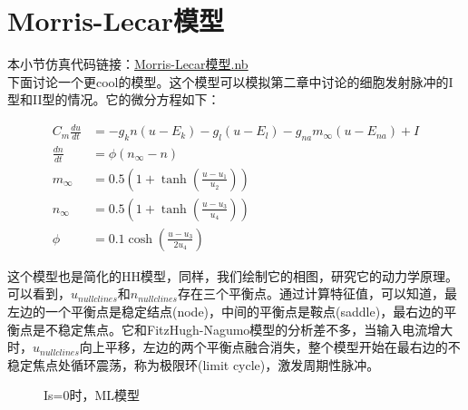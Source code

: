 \documentclass[12pt, a4paper, oneside]{ctexbook}
\begin{document}

\section{Morris-Lecar模型}
\textcolor[rgb]{1,0,0}{本小节仿真代码链接：\href{./降维到二维/Morris-Lecar模型.nb}{Morris-Lecar模型.nb}}\\
下面讨论一个更cool的模型。这个模型可以模拟第二章中讨论的细胞发射脉冲的I型和II型的情况。它的微分方程如下：

\begin{equation}
    \begin{aligned}
        C_m\frac{du}{dt}&=-g_k n (u-E_k)-g_l (u-E_l)-g_{na} m_\infty (u-E_{na})+I\\
        \frac{dn}{dt}&=\phi  (n_\infty-n)\\
        m_\infty&=0.5 (1+\tanh(\frac{u-u_1}{u_2}))\\
        n_\infty&=0.5 (1+\tanh(\frac{u-u_3}{u_4}))\\
        \phi &=0.1 \cosh (\frac{u-u_3}{2 u_4})
    \end{aligned}
\end{equation}

这个模型也是简化的HH模型，同样，我们绘制它的相图，研究它的动力学原理。可以看到，$u_{nullclines}$和$n_{nullclines}$存在三个平衡点。通过计算特征值，可以知道，最左边的一个平衡点是稳定结点(node)，中间的平衡点是鞍点(saddle)，最右边的平衡点是不稳定焦点。它和FitzHugh-Nagumo模型的分析差不多，当输入电流增大时，$u_{nullclines}$向上平移，左边的两个平衡点融合消失，整个模型开始在最右边的不稳定焦点处循环震荡，称为极限环(limit cycle)，激发周期性脉冲。

\begin{figure}[H]
    \centering
    \caption{Is=0时，ML模型}
\end{figure}
\end{document}
